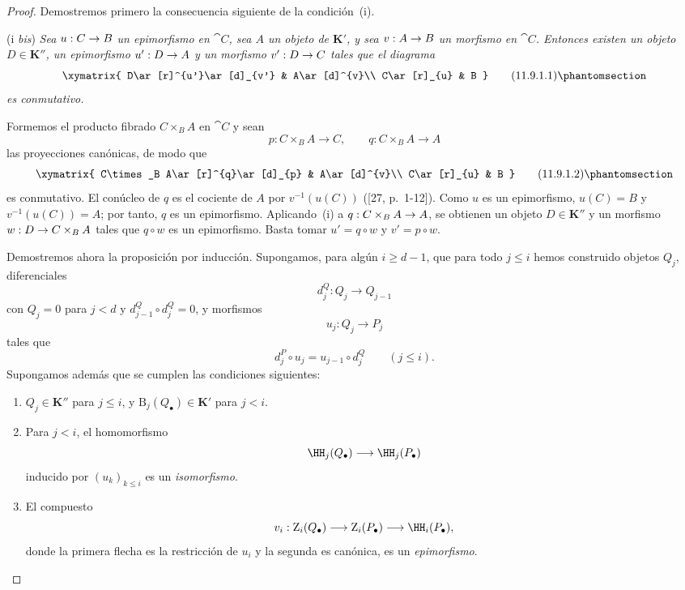 \documentclass[oneside]{amsart}
\makeatletter
\renewcommand{\leq}{\leqslant}
\renewcommand{\geq}{\geqslant}
\newcommand{\ega@arrow}[2]{\mathchoice{#1}{#2}{#2}{#2}}
\renewcommand{\to}{\ega@arrow{\longrightarrow}{\rightarrow}}
\newcommand{\oldpage}[2][]{{\marginnote{\normalfont\textbf{#1}~|~#2}}\ignorespaces}
\let\EGAOriginalLabel\label
\renewcommand{\label}[1]{\phantomsection\EGAOriginalLabel{#1}}
\makeatother
\begin{document}
\begin{proof}
Demostremos primero la consecuencia siguiente de la condición~(i).

\medskip\noindent
(i \emph{bis})
\emph{Sea $u:C\to B$ un epimorfismo en $\cat{C}$, sea $A$ un
objeto de $\boldsymbol K'$, y sea $v:A\to B$ un morfismo en $\cat{C}$.
Entonces existen un objeto $D\in\boldsymbol K''$, un epimorfismo $u':D\to A$ y un
morfismo $v':D\to C$ tales que el diagrama}
\[
  \xymatrix{
    D\ar[r]^{u'}\ar[d]_{v'} & A\ar[d]^{v}\\
    C\ar[r]_{u} & B
  }
  \tag{11.9.1.1}\label{0.11.9.1.1}
\]
\emph{es conmutativo.}

Formemos el producto fibrado $C\times_B A$ en $\cat{C}$ y sean
\[
  p:C\times_B A\longrightarrow C,
  \qquad
  q:C\times_B A\longrightarrow A
\]
las proyecciones canónicas, de modo que
\oldpage[0\textsubscript{III}]{47}
\[
  \xymatrix{
    C\times_B A\ar[r]^{q}\ar[d]_{p} & A\ar[d]^{v}\\
    C\ar[r]_{u} & B
  }
  \tag{11.9.1.2}\label{0.11.9.1.2}
\]
es conmutativo.
El conúcleo de $q$ es el cociente de $A$ por $v^{-1}(u(C))$
([27, p.~1-12]).
Como $u$ es un epimorfismo, $u(C)=B$ y
$v^{-1}(u(C))=A$; por tanto, $q$ es un epimorfismo.
Aplicando~(i) a $q:C\times_B A\to A$, se obtienen un objeto
$D\in\boldsymbol K''$ y un morfismo $w:D\to C\times_B A$ tales que $q\circ w$ es
un epimorfismo.
Basta tomar $u'=q\circ w$ y $v'=p\circ w$.

\medskip
Demostremos ahora la proposición por inducción.
Supongamos, para algún $i\geq d-1$, que para todo $j\leq i$ hemos
construido objetos $Q_j$, diferenciales
\[
  d^Q_j:Q_j\longrightarrow Q_{j-1}
\]
con $Q_j=0$ para $j<d$ y
$d^Q_{j-1}\circ d^Q_j=0$, y morfismos
\[
  u_j:Q_j\longrightarrow P_j
\]
tales que
\[
  d^P_j\circ u_j=u_{j-1}\circ d^Q_j
  \qquad(j\leq i).
\]
Supongamos además que se cumplen las condiciones siguientes:
\begin{enumerate}
  \item[$(\mathrm{I}_i)$]
  $Q_j\in\boldsymbol K''$ para $j\leq i$, y
  $\mathrm{B}_j(Q_\bullet)\in\boldsymbol K'$ para $j<i$.

  \item[$(\mathrm{II}_i)$]
  Para $j<i$, el homomorfismo
  \[
    \HH_j(Q_\bullet)\longrightarrow\HH_j(P_\bullet)
  \]
  inducido por $(u_k)_{k\leq i}$ es un \emph{isomorfismo}.

  \item[$(\mathrm{III}_i)$]
  El compuesto
  \[
    v_i:
    \mathrm{Z}_i(Q_\bullet)
    \longrightarrow
    \mathrm{Z}_i(P_\bullet)
    \longrightarrow
    \HH_i(P_\bullet),
  \]
  donde la primera flecha es la restricción de $u_i$ y la segunda es
  canónica, es un \emph{epimorfismo}.
\end{enumerate}


\end{proof}
\end{document}
